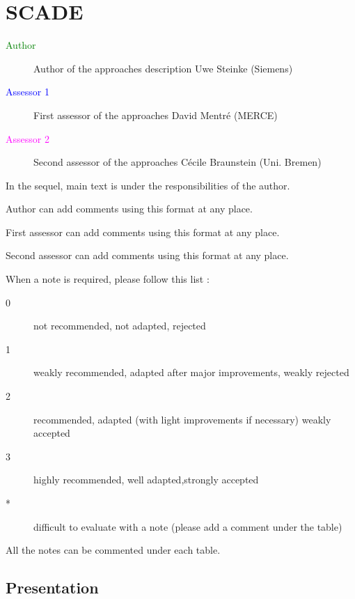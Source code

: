\chapter{SCADE}

\begin{description}
\item[\textcolor{green}{Author}] Author of the approaches description  Uwe Steinke (Siemens)
\item[\textcolor{blue}{Assessor 1}] First assessor of the approaches David Mentré (MERCE)
\item[\textcolor{magenta}{Assessor 2}] Second assessor of the approaches Cécile Braunstein (Uni. Bremen)
\end{description}

In the sequel, main text is under the responsibilities of the author.

\begin{author_comment}
Author can add comments using this format at any place.
\end{author_comment}

\begin{assessor1}
First assessor can add comments using this format at any place.
\end{assessor1}

\begin{assessor2}
Second assessor can add comments using this format at any place.
\end{assessor2}

When a note is required, please follow this list :
\begin{description}
\item[0] not recommended, not adapted, rejected
\item[1] weakly recommended, adapted after major improvements, weakly rejected
\item[2] recommended, adapted (with light improvements if necessary)  weakly accepted
\item[3] highly recommended, well adapted,strongly accepted
\item[*] difficult to evaluate with a note (please add a comment under the table)
\end{description}

All the notes can be commented under each table.

\section{Presentation}

